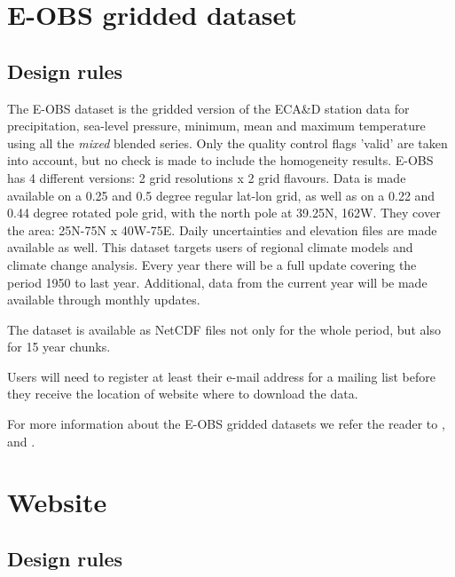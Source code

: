 \documentclass[a4paper,11pt]{article}
\begin{document}
\section{E-OBS gridded dataset}
\label{sec:eobs}
\subsection{Design rules}
\label{sec:eobsrules}

The E-OBS dataset is the gridded version of the ECA\&D station data
for precipitation, sea-level pressure, minimum, mean and maximum temperature using all the
\emph{mixed} blended series. Only the quality control flags 'valid' are taken into
account, but no check is made to include the homogeneity
results. E-OBS has 4 different versions: 2 grid resolutions x 2 grid
flavours. Data is made available on a 0.25 and 0.5 degree regular
lat-lon grid, as well as on a 0.22 and 0.44 degree rotated pole grid,
with the north pole at 39.25N, 162W. They cover the area: 25N-75N x
40W-75E. Daily uncertainties and elevation files are made available as
well. This dataset targets users of regional climate models and
climate change analysis. Every year there will be a full update
covering the period 1950 to last year. Additional, data from the
current year will be made available through monthly updates.

The dataset is available as NetCDF files not only for the whole
period, but also for 15 year chunks. 

Users will need to register at least their e-mail address for a
mailing list before they receive the location of website where to
download the data.

For more information about the E-OBS gridded datasets we refer the
reader to \citet{haylock}, \citet{hofstra} and \citet{besselaar2011}.


\section{Website}
\label{sec:website}
\subsection{Design rules}
\label{sec:websiterules}
\end{document}
